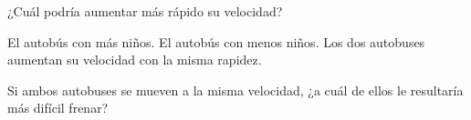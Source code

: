 \begin{multicols}{2}
\begin{parts}









        ¿Cuál podría aumentar más rápido su velocidad?

        \begin{choices}
            \choice El autobús con más niños.
            \choice El autobús con menos niños.
            \choice Los dos autobuses aumentan su velocidad con la misma rapidez.
        \end{choices}

        Si ambos autobuses se mueven a la misma velocidad, ¿a cuál de ellos le resultaría más difícil frenar?


\end{parts}
\end{multicols}
